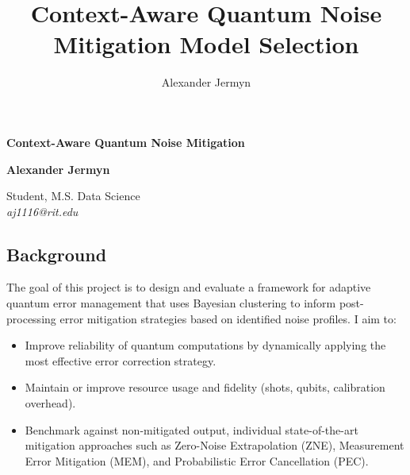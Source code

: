 \documentclass[12pt]{article}
\title{Context-Aware Quantum Noise Mitigation Model Selection}
\author{Alexander Jermyn}
\newenvironment{tightitemize}{
  \begin{itemize}\setlength\itemsep{0pt}\setlength\parskip{0pt}\setlength\parsep{0pt}}
  {\end{itemize}}
\begin{document}
\pagestyle{empty}

\begin{center}
{\large\bf Context-Aware Quantum Noise Mitigation}
\end{center}

\begin{center}
    \begin{minipage}{0.48\linewidth}
        \begin{center}
        {\bf Alexander Jermyn}\\
        \begin{small}
        Student, M.S. Data Science\\
        {\it aj1116@rit.edu}
        \end{small}
        \end{center}
    \end{minipage}
\end{center}


\subsection*{Background}
 
The goal of this project is to design and evaluate a framework for adaptive quantum error management that uses Bayesian clustering to inform post-processing error mitigation strategies based on identified noise profiles.
I aim to:
\begin{tightitemize}
    \item Improve reliability of quantum computations by dynamically applying the most effective error correction strategy.
    \item Maintain or improve resource usage and fidelity (shots, qubits, calibration overhead).
    \item Benchmark against non-mitigated output, individual state-of-the-art mitigation approaches such as Zero-Noise Extrapolation (ZNE), Measurement Error Mitigation (MEM), and Probabilistic Error Cancellation (PEC).  %
\end{tightitemize}
\end{document}
